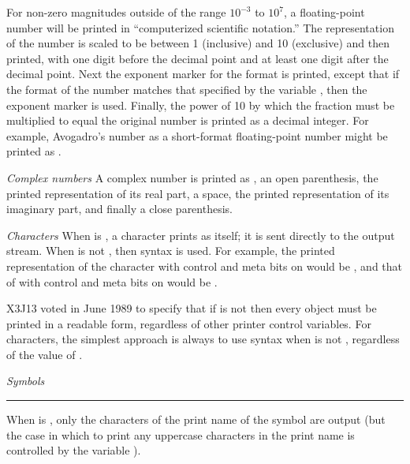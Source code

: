 \begin{flushdesc}
For non-zero magnitudes
outside of the range $10^{-3}$
to $10^7$, a floating-point number
will be printed in ``computerized scientific
notation.''  The representation of the number is scaled to be between
1 (inclusive) and 10 (exclusive) and then printed, with one digit
before the decimal point and at least one digit after the decimal point.
Next the exponent marker for the format is printed,
except that
if the format of the number matches that specified by the variable
, then the exponent marker 
is used.
Finally, the power of 10 by which the fraction must be multiplied
to equal the original number is printed as a decimal integer.
For example, Avogadro's number as a short-format floating-point number
might be printed as .

\item[{\it Complex numbers}]
A complex number is printed as ,
an open parenthesis,
the printed representation of its real part, a space,
the printed representation of its imaginary part, and finally
a close parenthesis.


\begin{obsolete}
\item[{\it Characters}]
When  is {\false}, a character prints as itself;
it is sent directly to the output stream.
When  is not {\false}, then \cd{\#{\Xbackslash}} syntax is used.
For example, the
printed representation of the character  with control and meta
bits on would be , and that of  with
control and meta bits on would be .
\end{obsolete}
\begin{newer}
X3J13 voted in June 1989  to specify that if 
is not {\false} then every object must be printed in a readable form,
regardless of other printer control variables.  For characters, the simplest approach
is always to use \cd{\#{\Xbackslash}} syntax when 
is not {\false}, regardless of the value of .
\end{newer}


\begin{obsolete}
\item[{\it Symbols}]

\hrule width 0pt\relax

When  is {\false}, only the characters of the print name
of the symbol are output (but the case in which to print any
uppercase characters in the print name is controlled by the
variable ).
\end{obsolete}


\end{flushdesc}
